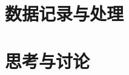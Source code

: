 \documentclass[12pt,a4paper,oneside]{ctexart}
\begin{document}
\section{数据记录与处理}
\section{思考与讨论}
\end{document}
